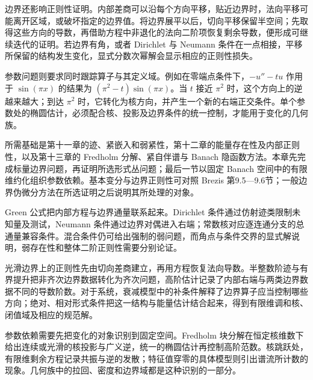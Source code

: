 \ProseParagraphBreak

边界还影响正则性证明。内部差商可以沿每个方向平移，贴近边界时，法向平移可能离开区域，或破坏指定的边界值。将边界展平以后，切向平移保留半空间；先取得这些方向的导数，再借助方程中非退化的法向二阶项恢复剩余导数，便形成可继续迭代的证明。若边界有角，或者 Dirichlet 与 Neumann 条件在一点相接，平移所保留的结构发生变化，显式分数次幂解会显示相应的正则性损失。

\ProseParagraphBreak

参数问题则要求同时跟踪算子与其定义域。例如在零端点条件下，\(-u''-t u\) 作用于 \(\sin(\pi x)\) 的结果为 \((\pi^2-t)\sin(\pi x)\)。当 \(t\) 接近 \(\pi^2\) 时，这个方向上的逆越来越大；到达 \(\pi^2\) 时，它转化为核方向，并产生一个新的右端正交条件。单个参数处的椭圆估计，必须配合核、投影及边界条件的统一控制，才能用于变化的几何族。

\ProseParagraphBreak

所需基础是第十一章的迹、紧嵌入和弱紧性，第十二章的能量存在性及内部正则性，以及第十三章的 Fredholm 分解、紧自伴谱与 Banach 隐函数方法。本章先完成标量边界问题，再证明所选形式丛问题；最后一节以固定 Banach 空间中的有限维约化组织参数依赖。基本变分与边界正则性可对照 Brezis 第9.5—9.6节\cite[第9.5—9.6节]{Brezis2011}；一般边界伪微分方法在所选证明之后说明其所处理的对象。






\begin{chaptersummary}
	Green 公式把内部方程与边界通量联系起来。Dirichlet 条件通过仿射迹类限制未知量及测试，Neumann 条件通过边界对偶进入右端；常数核对应逐连通分支的总通量兼容条件。混合条件仍可给出强制的弱问题，而角点与条件交界的显式解说明，弱存在性和整体二阶正则性需要分别论证。

	\ProseParagraphBreak

	光滑边界上的正则性先由切向差商建立，再用方程恢复法向导数。半整数阶迹与有界提升把非齐次边界数据转化为齐次问题，高阶估计记录了内部右端与两类边界数据不同的导数阶数。对于系统，衰减模型中的补条件解释了边界算子应当控制哪些方向；绝对、相对形式条件把这一结构与能量估计结合起来，得到有限维调和核、闭值域及相应的规范解。

	\ProseParagraphBreak

	参数依赖需要先把变化的对象识别到固定空间。Fredholm 块分解在恒定核维数下给出连续或光滑的核投影与广义逆，统一的椭圆估计再控制高阶范数。核跳跃处，有限维剩余方程记录共振与逆的发散；特征值穿零的具体模型则引出谱流所计数的现象。几何族中的拉回、密度和边界域都是这种识别的一部分。
\end{chaptersummary}


